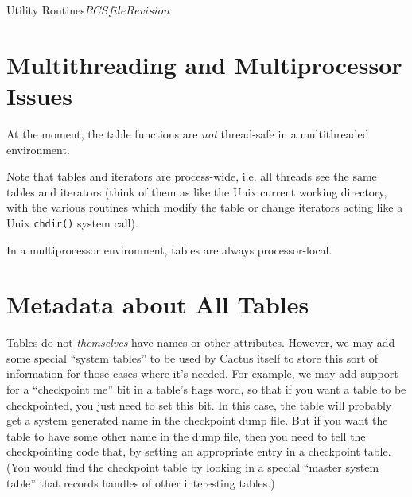 \begin{cactuspart}{Utility Routines}{$RCSfile$}{$Revision$}

\section{Multithreading and Multiprocessor Issues}

At the moment, the table functions are \emph{not} thread-safe
in a multithreaded environment. 

Note that tables and iterators are process-wide, i.e. all
threads see the same tables and iterators (think of them as like the
Unix current working directory, with the various routines which modify
the table or change iterators acting like a Unix \verb|chdir()| system
call).

In a multiprocessor environment, tables are always processor-local.


\section{Metadata about All Tables}

Tables do not \emph{themselves} have names or other
attributes.  However, we may add some special
``system tables'' to be used by Cactus itself to store this sort of
information for those cases where it's needed. For example, we may add support for a
``checkpoint me'' bit in a table's flags word, so that if you want a
table to be checkpointed, you just need to set this bit.
In this case, the table will probably get a system generated name in
the checkpoint dump file.  But if you want the table to have some
other name in the dump file, then you need to tell the checkpointing
code that, by setting an appropriate entry in a checkpoint table.
(You would find the checkpoint table by looking in a special
``master system table'' that records handles of other interesting tables.)


\end{cactuspart}

